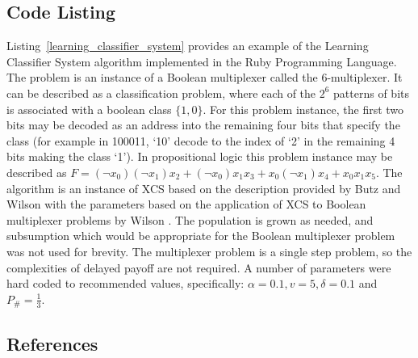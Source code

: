 \subsection{Code Listing}
Listing~\ref{learning_classifier_system} provides an example of the Learning Classifier System algorithm implemented in the Ruby Programming Language. 
The problem is an instance of a Boolean multiplexer called the 6-multiplexer. It can be described as a classification problem, where each of the $2^6$ patterns of bits is associated with a boolean class $\{1,0\}$. For this problem instance, the first two bits may be decoded as an address into the remaining four bits that specify the class (for example in 100011, `10' decode to the index of `2' in the remaining 4 bits making the class `1'). In propositional logic this problem instance may be described as $F=(\neg x_0) (\neg x_1) x_2 + (\neg x_0) x_1 x_3 + x_0 (\neg x_1) x_4 + x_0 x_1 x_5$. 
The algorithm is an instance of XCS based on the description provided by Butz and Wilson \cite{Butz2002a} with the parameters based on the application of XCS to Boolean multiplexer problems by Wilson \cite{Wilson1995, Wilson1998}.
The population is grown as needed, and subsumption which would be appropriate for the Boolean multiplexer problem was not used for brevity. The multiplexer problem is a single step problem, so the complexities of delayed payoff are not required. A number of parameters were hard coded to recommended values, specifically: $\alpha=0.1, v=5, \delta=0.1$ and $P_{\#}=\frac{1}{3}$.




\subsection{References}

